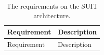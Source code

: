 \documentclass[0-thesis.tex]{subfiles}
\begin{document}
\begin{small}
\begin{longtable}[]{@{}ll@{}}
        \caption{The requirements on the SUIT architecture.}
        \label{tab:architecture-requirements}\\
        \toprule
        \begin{minipage}[b]{0.41\columnwidth}\raggedright\strut
        Requirement\strut
        \end{minipage} & \begin{minipage}[b]{0.53\columnwidth}\raggedright\strut
        Description\strut
        \end{minipage}\tabularnewline
        \midrule
        \endfirsthead
        \toprule
        \begin{minipage}[b]{0.41\columnwidth}\raggedright\strut
        Requirement\strut
        \end{minipage} & \begin{minipage}[b]{0.53\columnwidth}\raggedright\strut
        Description\strut
        \end{minipage}\tabularnewline
        \midrule
        \endhead


\end{longtable}
\end{small}
\end{document}
